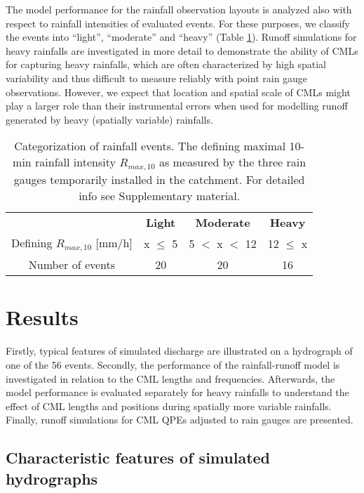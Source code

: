 \documentclass{ctuthesis}\usepackage[]{graphicx}\usepackage[]{color}
\begin{document}
The model performance for the rainfall observation layouts is analyzed also with respect to rainfall intensities of evaluated events. For these purposes, we classify the events into “light”, “moderate” and “heavy” (Table \ref{2tab2}). Runoff simulations for heavy rainfalls are investigated in more detail to demonstrate the ability of CMLs for capturing heavy rainfalls, which are often characterized by high spatial variability and thus difficult to measure reliably with point rain gauge observations. However, we expect that location and spatial scale of CMLs might play a larger role than their instrumental errors when used for modelling runoff generated by heavy (spatially variable) rainfalls.

\begin{table}[h]
\begin{ctucolortab}
\centering
\begin{tabular}{ c | c  c  c  }
	    &       \textbf{Light}   &  \bfseries Moderate  &  \bfseries  Heavy    \\ \Midrule
        Defining $R_{max,10}$ [mm/h]  &  x $\leq$ 5  & 5 $<$ x $<$ 12 &  12 $\leq$ x     \\
            Number of events  &  20  & 20 &  16
\end{tabular}
\caption{Categorization of rainfall events. The defining maximal 10-min rainfall intensity $R_{max,10}$ as measured by the three rain gauges temporarily installed in the catchment. For detailed info see Supplementary material.}
\label{2tab2}
\end{ctucolortab}
\end{table}

\section{Results}

Firstly, typical features of simulated discharge are illustrated on a hydrograph of one of the 56 events. Secondly, the performance of the rainfall-runoff model is investigated in relation to the CML lengths and frequencies. Afterwards, the model performance is evaluated separately for heavy rainfalls to understand the effect of CML lengths and positions during spatially more variable rainfalls. Finally, runoff simulations for CML QPEs adjusted to rain gauges are presented.

\subsection{Characteristic features of simulated hydrographs}
\end{document}
